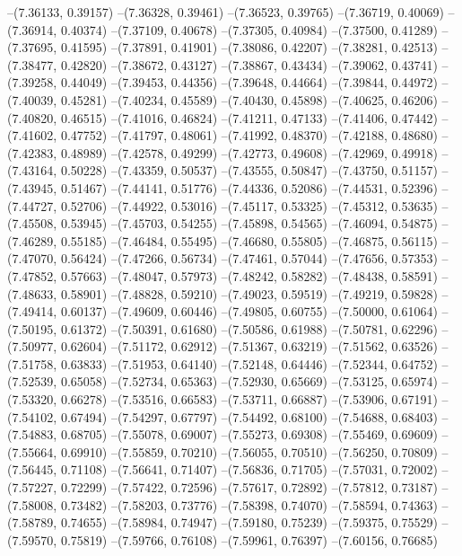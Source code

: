 --(7.36133, 0.39157)
--(7.36328, 0.39461)
--(7.36523, 0.39765)
--(7.36719, 0.40069)
--(7.36914, 0.40374)
--(7.37109, 0.40678)
--(7.37305, 0.40984)
--(7.37500, 0.41289)
--(7.37695, 0.41595)
--(7.37891, 0.41901)
--(7.38086, 0.42207)
--(7.38281, 0.42513)
--(7.38477, 0.42820)
--(7.38672, 0.43127)
--(7.38867, 0.43434)
--(7.39062, 0.43741)
--(7.39258, 0.44049)
--(7.39453, 0.44356)
--(7.39648, 0.44664)
--(7.39844, 0.44972)
--(7.40039, 0.45281)
--(7.40234, 0.45589)
--(7.40430, 0.45898)
--(7.40625, 0.46206)
--(7.40820, 0.46515)
--(7.41016, 0.46824)
--(7.41211, 0.47133)
--(7.41406, 0.47442)
--(7.41602, 0.47752)
--(7.41797, 0.48061)
--(7.41992, 0.48370)
--(7.42188, 0.48680)
--(7.42383, 0.48989)
--(7.42578, 0.49299)
--(7.42773, 0.49608)
--(7.42969, 0.49918)
--(7.43164, 0.50228)
--(7.43359, 0.50537)
--(7.43555, 0.50847)
--(7.43750, 0.51157)
--(7.43945, 0.51467)
--(7.44141, 0.51776)
--(7.44336, 0.52086)
--(7.44531, 0.52396)
--(7.44727, 0.52706)
--(7.44922, 0.53016)
--(7.45117, 0.53325)
--(7.45312, 0.53635)
--(7.45508, 0.53945)
--(7.45703, 0.54255)
--(7.45898, 0.54565)
--(7.46094, 0.54875)
--(7.46289, 0.55185)
--(7.46484, 0.55495)
--(7.46680, 0.55805)
--(7.46875, 0.56115)
--(7.47070, 0.56424)
--(7.47266, 0.56734)
--(7.47461, 0.57044)
--(7.47656, 0.57353)
--(7.47852, 0.57663)
--(7.48047, 0.57973)
--(7.48242, 0.58282)
--(7.48438, 0.58591)
--(7.48633, 0.58901)
--(7.48828, 0.59210)
--(7.49023, 0.59519)
--(7.49219, 0.59828)
--(7.49414, 0.60137)
--(7.49609, 0.60446)
--(7.49805, 0.60755)
--(7.50000, 0.61064)
--(7.50195, 0.61372)
--(7.50391, 0.61680)
--(7.50586, 0.61988)
--(7.50781, 0.62296)
--(7.50977, 0.62604)
--(7.51172, 0.62912)
--(7.51367, 0.63219)
--(7.51562, 0.63526)
--(7.51758, 0.63833)
--(7.51953, 0.64140)
--(7.52148, 0.64446)
--(7.52344, 0.64752)
--(7.52539, 0.65058)
--(7.52734, 0.65363)
--(7.52930, 0.65669)
--(7.53125, 0.65974)
--(7.53320, 0.66278)
--(7.53516, 0.66583)
--(7.53711, 0.66887)
--(7.53906, 0.67191)
--(7.54102, 0.67494)
--(7.54297, 0.67797)
--(7.54492, 0.68100)
--(7.54688, 0.68403)
--(7.54883, 0.68705)
--(7.55078, 0.69007)
--(7.55273, 0.69308)
--(7.55469, 0.69609)
--(7.55664, 0.69910)
--(7.55859, 0.70210)
--(7.56055, 0.70510)
--(7.56250, 0.70809)
--(7.56445, 0.71108)
--(7.56641, 0.71407)
--(7.56836, 0.71705)
--(7.57031, 0.72002)
--(7.57227, 0.72299)
--(7.57422, 0.72596)
--(7.57617, 0.72892)
--(7.57812, 0.73187)
--(7.58008, 0.73482)
--(7.58203, 0.73776)
--(7.58398, 0.74070)
--(7.58594, 0.74363)
--(7.58789, 0.74655)
--(7.58984, 0.74947)
--(7.59180, 0.75239)
--(7.59375, 0.75529)
--(7.59570, 0.75819)
--(7.59766, 0.76108)
--(7.59961, 0.76397)
--(7.60156, 0.76685)
